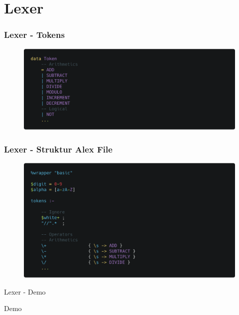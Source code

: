 \section{Lexer}

\begin{frame}[fragile]
	\frametitle{Lexer - Tokens}
	\begin{figure}[H]
		\centering
		\includegraphics[width=0.8\linewidth]{images/lexer/tokens.png}
	\end{figure}
\end{frame}

\begin{frame}[fragile]
	\frametitle{Lexer - Struktur Alex File}
	\begin{figure}[H]
		\centering
		\includegraphics[width=0.8\linewidth]{images/lexer/parser-mapping.png}
	\end{figure}
\end{frame}

\begin{frame}{Lexer - Demo}

\begin{center}
	\Huge Demo
\end{center}

\end{frame}
